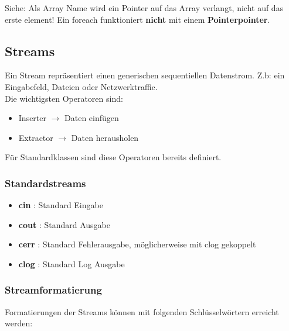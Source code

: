 

Siehe: Als Array Name wird ein Pointer auf das Array verlangt, nicht auf das erste element!  
Ein foreach funktioniert \textbf{nicht} mit einem \textbf{Pointerpointer}. 

\subsection{Streams}

Ein Stream repräsentiert einen generischen sequentiellen Datenstrom. Z.b: ein Eingabefeld, Dateien oder Netzwerktraffic.\\
Die wichtigsten Operatoren sind:

\begin{itemize}[itemsep=1pt, parsep=0pt]
    \item \say{$<<$} Inserter $\rightarrow$  Daten einfügen
    \item \say{$>>$} Extractor $\rightarrow$ Daten herausholen
\end{itemize}

Für Standardklassen sind diese Operatoren bereits definiert.

\subsubsection{Standardstreams}

\begin{itemize}[itemsep=1pt, parsep=0pt]
    \item \textbf{cin} : Standard Eingabe
    \item \textbf{cout} : Standard Ausgabe
    \item \textbf{cerr} : Standard Fehlerausgabe, möglicherweise mit clog gekoppelt 
    \item \textbf{clog} : Standard Log Ausgabe 
\end{itemize}

\subsubsection{Streamformatierung}

Formatierungen der Streams können mit folgenden Schlüsselwörtern erreicht werden:


